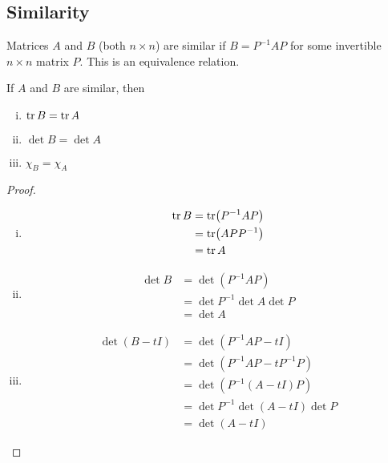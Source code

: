 \subsection{Similarity}
Matrices $A$ and $B$ (both $n \times n$) are similar if $B = P^{-1}AP$ for some invertible $n\times n$ matrix $P$. This is an equivalence relation.
\begin{proposition}
	If $A$ and $B$ are similar, then
	\begin{enumerate}[(i)]
		\item $\tr B = \tr A$
		\item $\det B = \det A$
		\item $\chi_B = \chi_A$
	\end{enumerate}
\end{proposition}
\begin{proof}
	\begin{enumerate}[(i)]
		\item \begin{align*}
			      \tr B & = \tr (P^{-1}AP) \\&= \tr(APP^{-1}) \\&= \tr A
		      \end{align*}
		\item \begin{align*}
			      \det B & = \det (P^{-1}AP) \\&= \det P^{-1} \det A \det P \\&= \det A
		      \end{align*}
		\item \begin{align*}
			      \det(B - tI) & = \det(P^{-1}AP - tI) \\&= \det(P^{-1}AP - tP^{-1}P) \\&= \det(P^{-1}(A - tI)P) \\&= \det P^{-1} \det(A - tI) \det P \\&= \det(A - tI)
		      \end{align*}
	\end{enumerate}
\end{proof}
